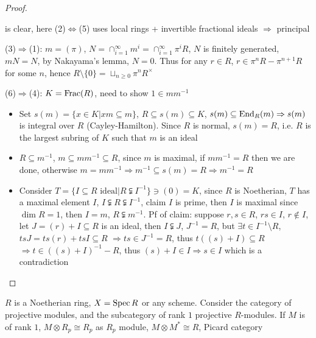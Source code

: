 \documentclass[../main.tex]{subfiles}
\begin{document}
\begin{proof}
\begin{center}
\end{center}
is clear, here (2)$\Leftrightarrow$(5) uses local rings + invertible fractional ideals $\Rightarrow$ principal \par
(3)$\Rightarrow$(1): $m=(\pi)$, $N=\cap_{i=1}^\infty m^i=\cap_{i=1}^\infty\pi^iR$, $N$ is finitely generated, $mN=N$, by Nakayama's lemma, $N=0$. Thus for any $r\in R$, $r\in\pi^nR-\pi^{n+1}R$ for some $n$, hence $R\setminus\{0\}=\sqcup_{n\geq0}\pi^nR^\times$ \par
(6)$\Rightarrow$(4): $K=\operatorname{Frac}(R)$, need to show $1\in mm^{-1}$
\begin{itemize}
\item Set $s(m)=\{x\in K|xm\subseteq m\}$, $R\subseteq s(m)\subseteq K$, $s(m)\subseteq\operatorname{End}_R(m)\Rightarrow s(m)$ is integral over $R$ (Cayley-Hamilton). Since $R$ is normal, $s(m)=R$, i.e. $R$ is the largest subring of $K$ such that $m$ is an ideal
\item $R\subseteq m^{-1}$, $m\subseteq mm^{-1}\subseteq R$, since $m$ is maximal, if $mm^{-1}=R$ then we are done, otherwise $m=mm^{-1}\Rightarrow m^{-1}\subseteq s(m)=R\Rightarrow m^{-1}=R$
\item Consider $T=\{I\subseteq R\text{ ideal}|R\subsetneqq I^{-1}\}\ni(0)=K$, since $R$ is Noetherian, $T$ has a maximal element $I$, $I\subsetneqq R \subsetneqq I^{-1}$, claim $I$ is prime, then $I$ is maximal since $\dim R=1$, then $I=m$, $R\subsetneqq m^{-1}$. Pf of claim: suppose $r,s\in R$, $rs\in I$, $r\notin I$, let $J=(r)+I\subseteq R$ is an ideal, then $I\subsetneqq J$, $J^{-1}=R$, but $\exists t\in I^{-1}\setminus R$, $tsJ=ts(r)+tsI\subseteq R$ $\Rightarrow ts\in J^{-1}=R$, thus $t((s)+I)\subseteq R$ $\Rightarrow t\in((s)+I)^{-1}-R$, thus $(s)+I\in I\Rightarrow s\in I$ which is a contradiction
\end{itemize}
\end{proof}

$R$ is a Noetherian ring, $X=\operatorname{Spec} R$ or any scheme. Consider the category of projective modules, and the subcategory of rank $1$ projective $R$-modules. If $M$ is of rank $1$, $M\otimes R_p\cong R_p$ as $R_p$ module, $M\otimes M^*\cong R$, Picard category
\end{document}
